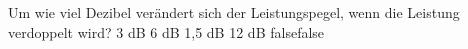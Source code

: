     {Um wie viel Dezibel verändert sich der Leistungspegel, wenn die Leistung verdoppelt wird?}
    {3 dB}
    {6 dB}
    {1,5 dB}
    {12 dB}
    {false}{false}